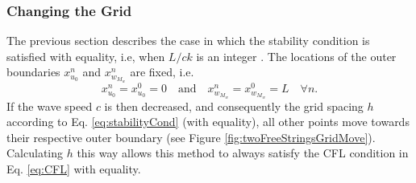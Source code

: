 \subsubsection{Changing the Grid}
The previous section describes the case in which the stability condition is satisfied with equality, i.e, when $L/ck$ is an integer%
. The locations of the outer boundaries $x_{u_0}^n$ and $x_{w_{M_w}}^n$ are fixed, i.e.
\begin{equation*}
    x_{u_0}^n = x_{u_0}^0 = 0 \quad \text{and}\quad x_{w_{M_w}}^n = x_{w_{M_w}}^0 = L \quad \forall n.
\end{equation*}
If the wave speed $c$ is then decreased, and consequently the grid spacing $h$ according to Eq. \eqref{eq:stabilityCond} (with equality), all other points move towards their respective outer boundary (see Figure \ref{fig:twoFreeStringsGridMove}). Calculating $h$ this way allows this method to always satisfy the CFL condition in Eq. \eqref{eq:CFL} with equality. %


